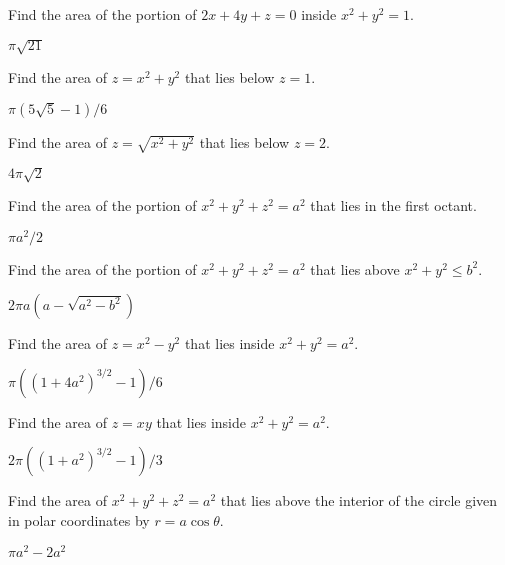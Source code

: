 \begin{exercises}
\begin{exercise}
\begin{exercise}
\begin{exercise} Find the area of the portion of $2x+4y+z=0$
inside $x^2+y^2=1$.
\begin{answer} $\pi\sqrt{21}$
\end{answer}\end{exercise}

\begin{exercise} Find the area of $z=x^2+y^2$ that lies below $z=1$.
\begin{answer} $\pi(5\sqrt5-1)/6$
\end{answer}\end{exercise}

\begin{exercise} Find the area of $z=\sqrt{x^2+y^2}$ that lies below $z=2$.
\begin{answer} $4\pi\sqrt2$
\end{answer}\end{exercise}

\begin{exercise} Find the area of the portion of $x^2+y^2+z^2=a^2$ that lies
in the first octant.
\begin{answer} $\pi a^2/2$
\end{answer}\end{exercise}

\begin{exercise} Find the area of the portion of $x^2+y^2+z^2=a^2$ that lies
above $x^2+y^2\le b^2$.
\begin{answer} $2\pi a(a-\sqrt{a^2-b^2})$
\end{answer}\end{exercise}

\begin{exercise} Find the area of $z=x^2-y^2$ that lies inside $x^2+y^2=a^2$.
\begin{answer} $\pi((1+4a^2)^{3/2}-1)/6$
\end{answer}\end{exercise}

\begin{exercise} Find the area of $z=xy$ that lies inside $x^2+y^2=a^2$.
\begin{answer} $2\pi((1+a^2)^{3/2}-1)/3$
\end{answer}\end{exercise}

\begin{exercise} Find the area of $x^2+y^2+z^2=a^2$ 
that lies above the interior of the circle given in polar coordinates
by $r=a\cos \theta$.
\begin{answer} $\pi a^2-2a^2$
\end{answer}\end{exercise}


\end{exercise}
\end{exercise}
\end{exercises}

